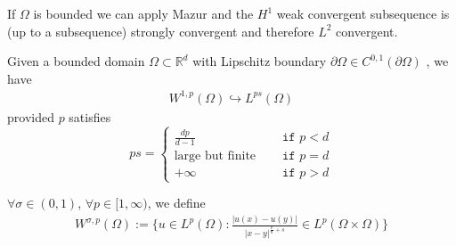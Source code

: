 \begin{remark}
If $\Omega$ is bounded we can apply Mazur and the $H^1$ weak convergent subsequence is (up to a subsequence) strongly convergent and therefore $L^2$ convergent. 
\end{remark}

\begin{theorem}
	Given a bounded domain $\Omega \subset \mathbb{R}^d$ with Lipschitz boundary $\partial\Omega \in C^{0, 1}(\partial\Omega)$ , we have
	\begin{align*}
		W^{1, p}(\Omega) \hookrightarrow L^{ps}(\Omega)
	\end{align*} 
	provided $p$ satisfies
	\begin{equation}
	ps = \left\{
	\begin{aligned}
		 \frac{dp}{d - 1} &\texttt{ if } p < d\\
		\text{large but finite} \quad &\texttt{ if } p = d\\
		+ \infty \quad  &\texttt{ if } p > d
	\end{aligned}
	\right.
	\end{equation}
\end{theorem}

\begin{definition}
	$\forall \sigma \in (0, 1)$, $\forall p \in [1, \infty)$, we define 
	\begin{align*}
		W^{\sigma, p}(\Omega):= \bigg\{ u \in L^p(\Omega): \frac{|u(x) - u(y)|}{|x - y|^{\frac{p}{n} + s}} \in L^p(\Omega \times \Omega) \bigg\}
	\end{align*}
\end{definition}

